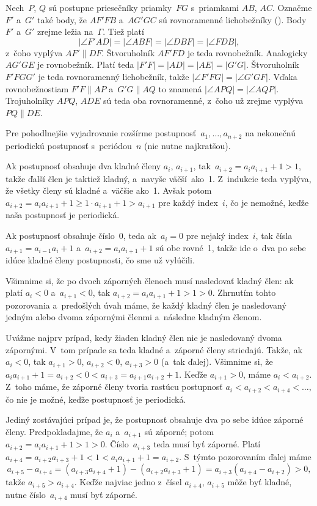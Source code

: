 {\ineriesenie
Nech~$P$, $Q$ sú postupne priesečníky priamky~$FG$ s~priamkami $AB$, $AC$. Označme $F'$ a~$G'$ také body, že $AF'FB$ a~$AG'GC$ sú rovnoramenné lichobežníky (\obr). Body $F'$ a~$G'$ zrejme ležia na~$\Gamma$. Tiež platí
$$
|\angle F'AD| = |\angle ABF|=|\angle DBF|=|\angle FDB|,
$$
z~čoho vyplýva $AF' \parallel DF$. Štvoruholník $AF'FD$ je teda rovnobežník. Analogicky $AG'GE$ je rovnobežník. Platí teda $|F'F|=|AD|=|AE|=|G'G|$. Štvoruholník $F'FGG'$ je teda rovnoramenný lichobežník, takže $|\angle F'FG| = |\angle G'GF|$. Vďaka rovnobežnostiam $F'F \parallel AP$ a~$G'G \parallel AQ$ to znamená $|\angle APQ| = |\angle AQP|$. Trojuholníky $APQ$, $ADE$ sú teda oba rovnoramenné, z~čoho už zrejme vyplýva $PQ \parallel DE$. }

{%
Pre pohodlnejšie vyjadrovanie rozšírme postupnosť~$a_1,\dots,a_{n+2}$ na nekonečnú periodickú postupnosť s~periódou~$n$ (nie nutne najkratšou).

Ak postupnosť obsahuje dva kladné členy $a_i$, $a_{i+1}$, tak~$a_{i+2} = a_i a_{i+1} + 1 > 1$, takže ďalší člen je taktiež kladný, a~navyše väčší~ako~1. Z~indukcie teda vyplýva, že všetky členy sú kladné a~väčšie ako~1. Avšak potom $a_{i+2} = a_i a_{i+1} + 1 \ge 1 \cdot a_{i+1} + 1 > a_{i+1}$ pre každý index~$i$, čo je nemožné, keďže naša postupnosť je periodická.

Ak postupnosť obsahuje číslo~0, teda ak~$a_i=0$ pre nejaký index~$i$, tak čísla $a_{i+1}=a_{i-1}a_i+1$ a~$a_{i+2}=a_i a_{i+1}+1$ sú obe rovné~1, takže ide o~dva po sebe idúce kladné členy postupnosti, čo sme už vylúčili.

Všimnime si, že po dvoch záporných členoch musí nasledovať kladný člen: ak platí $a_i < 0$ a~$a_{i+1}<0$, tak $a_{i+2}=a_i a_{i+1}+1 > 1 > 0$. Zhrnutím tohto pozorovania a~predošlých úvah máme, že každý kladný člen je nasledovaný jedným alebo dvoma zápornými členmi a~následne kladným členom.

Uvážme najprv prípad, kedy žiaden kladný člen nie je nasledovaný dvoma zápornými. V~tom prípade sa teda kladné a~záporné členy striedajú. Takže, ak $a_i < 0$, tak $a_{i+1} > 0$, $a_{i+2} < 0$, $a_{i+3} > 0$ (a~tak ďalej). Všimnime si, že $a_i a_{i+1} + 1 = a_{i+2} < 0 < a_{i+3} = a_{i+1}a_{i+2}+1$. Keďže $a_{i+1}>0$, máme $a_i < a_{i+2}$. Z~toho máme, že záporné členy tvoria rastúcu postupnosť $a_i < a_{i+2} < a_{i+4} < \dots$, čo nie je možné, keďže postupnosť je periodická.

Jediný zostávajúci prípad je, že postupnosť obsahuje dva po sebe idúce záporné členy. Predpokladajme, že $a_i$ a~$a_{i+1}$ sú záporné; potom $a_{i+2}=a_i a_{i+1} + 1 > 1 > 0$. Číslo~$a_{i+3}$ teda musí byť záporné. Platí $a_{i+4}=a_{i+2}a_{i+3}+1 < 1 < a_i a_{i+1} + 1 = a_{i+2}$. S~týmto pozorovaním ďalej máme
$$
a_{i+5}-a_{i+4}=(a_{i+3}a_{i+4}+1)-(a_{i+2}a_{i+3}+1)=a_{i+3}(a_{i+4}-a_{i+2}) > 0,
$$
takže $a_{i+5}>a_{i+4}$. Keďže najviac jedno z~čísel $a_{i+4}$, $a_{i+5}$ môže byť kladné, nutne číslo~$a_{i+4}$ musí byť záporné.

}
